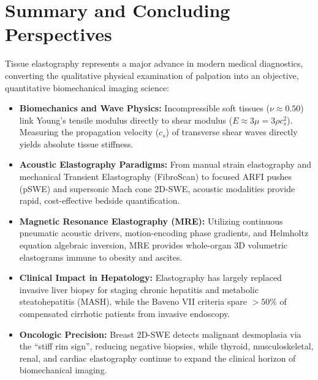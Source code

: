 \documentclass[11pt,a4paper]{article}
\begin{document}
\section{Summary and Concluding Perspectives}
Tissue elastography represents a major advance in modern medical diagnostics, converting the qualitative physical examination of palpation into an objective, quantitative biomechanical imaging science:

\begin{itemize}[leftmargin=2em]
    \item \textbf{Biomechanics and Wave Physics:} Incompressible soft tissues ($\nu \approx 0.50$) link Young's tensile modulus directly to shear modulus ($E \approx 3\mu = 3\rho c_s^2$). Measuring the propagation velocity ($c_s$) of transverse shear waves directly yields absolute tissue stiffness.
    \item \textbf{Acoustic Elastography Paradigms:} From manual strain elastography and mechanical Transient Elastography (FibroScan) to focused ARFI pushes (pSWE) and supersonic Mach cone 2D-SWE, acoustic modalities provide rapid, cost-effective bedside quantification.
    \item \textbf{Magnetic Resonance Elastography (MRE):} Utilizing continuous pneumatic acoustic drivers, motion-encoding phase gradients, and Helmholtz equation algebraic inversion, MRE provides whole-organ 3D volumetric elastograms immune to obesity and ascites.
    \item \textbf{Clinical Impact in Hepatology:} Elastography has largely replaced invasive liver biopsy for staging chronic hepatitis and metabolic steatohepatitis (MASH), while the Baveno VII criteria spare $> 50\%$ of compensated cirrhotic patients from invasive endoscopy.
    \item \textbf{Oncologic Precision:} Breast 2D-SWE detects malignant desmoplasia via the ``stiff rim sign'', reducing negative biopsies, while thyroid, musculoskeletal, renal, and cardiac elastography continue to expand the clinical horizon of biomechanical imaging.
\end{itemize}
\end{document}
